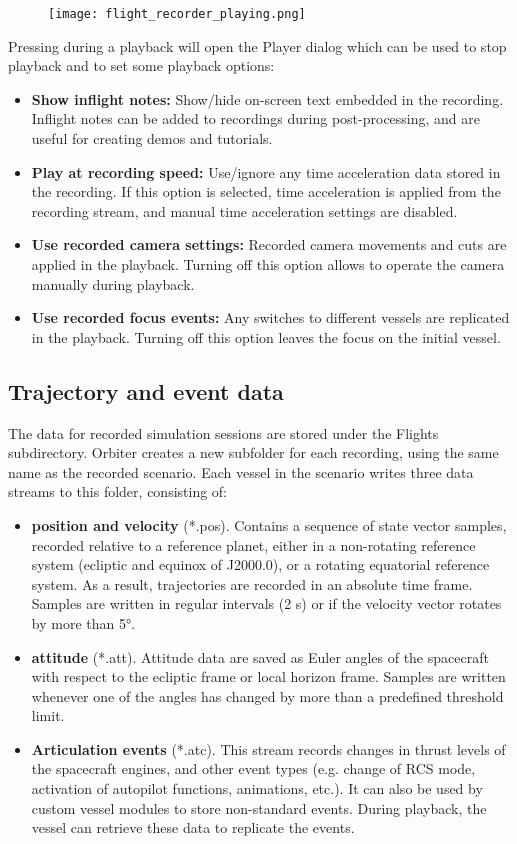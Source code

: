 \documentclass[Orbiter User Manual.tex]{subfiles}
\begin{document}
\begin{figure}[H]
	\centering
	\texttt{[image: flight\_recorder\_playing.png]}
\end{figure}

\noindent
Pressing \Ctrl{} during a playback will open the Player dialog which can be used to stop playback and to set some playback options:

\begin{itemize}
\item \textbf{Show inflight notes:} Show/hide on-screen text embedded in the recording. Inflight notes can be added to recordings during post-processing, and are useful for creating demos and tutorials.
\item \textbf{Play at recording speed:} Use/ignore any time acceleration data stored in the recording. If this option is selected, time acceleration is applied from the recording stream, and manual time acceleration settings are disabled.
\item \textbf{Use recorded camera settings:} Recorded camera movements and cuts are applied in the playback. Turning off this option allows to operate the camera manually during playback.
\item \textbf{Use recorded focus events:} Any switches to different vessels are replicated in the playback. Turning off this option leaves the focus on the initial vessel.
\end{itemize}


\subsection{Trajectory and event data}
The data for recorded simulation sessions are stored under the Flights subdirectory. Orbiter creates a new subfolder for each recording, using the same name as the recorded scenario. Each vessel in the scenario writes three data streams to this folder, consisting of:

\begin{itemize}
\item \textbf{position and velocity} (*.pos). Contains a sequence of state vector samples, recorded relative to a reference planet, either in a non-rotating reference system (ecliptic and equinox of J2000.0), or a rotating equatorial reference system. As a result, trajectories are recorded in an absolute time frame. Samples are written in regular intervals (2 s) or if the velocity vector rotates by more than 5°.
\item \textbf{attitude} (*.att). Attitude data are saved as Euler angles of the spacecraft with respect to the ecliptic frame or local horizon frame. Samples are written whenever one of the angles has changed by more than a predefined threshold limit.
\item \textbf{Articulation events} (*.atc). This stream records changes in thrust levels of the spacecraft engines, and other event types (e.g. change of RCS mode, activation of autopilot functions, animations, etc.). It can also be used by custom vessel modules to store non-standard events. During playback, the vessel can retrieve these data to replicate the events.
\end{itemize}
\end{document}
